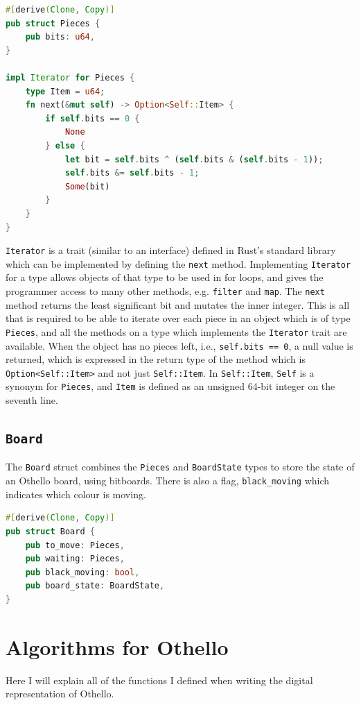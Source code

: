 \documentclass[12pt, a4paper]{report}
\begin{document}
\begin{lstlisting}[language=Rust]
#[derive(Clone, Copy)]
pub struct Pieces {
    pub bits: u64,
}

impl Iterator for Pieces {
    type Item = u64;
    fn next(&mut self) -> Option<Self::Item> {
        if self.bits == 0 {
            None
        } else {
            let bit = self.bits ^ (self.bits & (self.bits - 1));
            self.bits &= self.bits - 1;
            Some(bit)
        }
    }
}
\end{lstlisting}

\texttt{Iterator} is a trait (similar to an interface) defined in Rust's standard library which can be implemented by defining the \texttt{next} method. Implementing \texttt{Iterator} for a type allows 
objects of that type to be used in for loops, and gives the programmer access to many other methods, e.g. \texttt{filter} and \texttt{map}. 
The \texttt{next} method returns the least significant bit and mutates the inner integer. This is all that is required to be able to iterate over each piece in an object which is of type \texttt{Pieces}, 
and all the methods on a type which implements the \texttt{Iterator} trait are available.
When the object has no pieces left, i.e., \texttt{self.bits == 0}, a null value is returned, which is expressed in the return type of the method which is \texttt{Option<Self::Item>} and not just \texttt{Self::Item}.
In \texttt{Self::Item}, \texttt{Self} is a synonym for \texttt{Pieces}, and \texttt{Item} is defined as an unsigned 64-bit integer on the seventh line.

\subsection{\texttt{Board}}
The \texttt{Board} struct combines the \texttt{Pieces} and \texttt{BoardState} types to store the state of an Othello board, using bitboards. There is also a flag, \texttt{black\_moving} which indicates which colour is moving.

\begin{lstlisting}[language=Rust]
#[derive(Clone, Copy)]
pub struct Board {
    pub to_move: Pieces,
    pub waiting: Pieces,
    pub black_moving: bool,
    pub board_state: BoardState,
}
\end{lstlisting}

\section{Algorithms for Othello}
Here I will explain all of the functions I defined when writing the digital representation of Othello.
\end{document}

